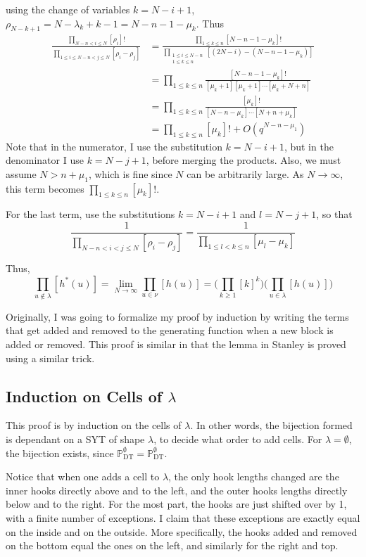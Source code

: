 \documentclass{amsart}
\newcommand{\dt}[1]{\mathbb{P}_\mathrm{DT}^{#1}}
\theoremstyle{definition}
\begin{document}
using the change of variables $k = N - i + 1$, $\rho_{N-k+1} = N -
\lambda_k + k - 1 = N - n - 1 - \mu_k$.  Thus
\begin{align*}
  \frac{\displaystyle
    \prod_{N-n < i \leq N}[\rho_i]!
  }{\displaystyle
    \prod_{1 \leq i \leq N-n < j \leq N}[\rho_i-\rho_j]
  }
  &= \frac{ \displaystyle
    \prod_{1 \leq k \leq n} [N - n - 1 - \mu_k]!
  }{\displaystyle
    \prod_{\substack{1 \leq i \leq N-n \\ 1 \leq k \leq n}} [(2N-i) -
    (N-n-1-\mu_k)]
  } \\
  &= \prod_{1\leq k \leq n} \frac{
    [N-n-1-\mu_k]!
  }{
    [\mu_k+1][\mu_k+1]\cdots [\mu_k + N + n]
    } \\
  &= \prod_{1\leq k \leq n} \frac{[\mu_k]!}{[N-n-\mu_k]\cdots
    [N+n+\mu_k]} \\
  &= \prod_{1\leq k \leq n} [\mu_k]! + O(q^{N-n-\mu_1})
\end{align*}
Note that in the numerator, I use the substitution $k = N - i + 1$,
but in the denominator I use $k = N - j + 1$, before merging the
products.  Also, we must assume $N > n + \mu_1$, which is fine since
$N$ can be arbitrarily large.  As $N \to \infty$, this term becomes
$\prod_{1\leq k\leq n}[\mu_k]!$.

For the last term, use the substitutions $k = N - i + 1$ and $l = N -
j + 1$, so that
\[
  \frac{1}{\displaystyle\prod_{N-n<i<j\leq N}[\rho_i - \rho_j]} =
  \frac{1}{\displaystyle\prod_{1\leq l<k\leq n}
    [\mu_l - \mu_k]}
\]

Thus,
\[
  \prod_{u \notin \lambda} [h^*(u)] =
  \lim_{N\to\infty} \prod_{u \in \nu} [h(u)] =
  \Bigg(\prod_{k\geq 1}[k]^k\Bigg)\Bigg( \prod_{u \in \lambda} [h(u)]\Bigg)
\]

Originally, I was going to formalize my proof by induction by writing
the terms that get added and removed to the generating function when a
new block is added or removed.  This proof is similar in that the
lemma in Stanley is proved using a similar trick.

\subsection{Induction on Cells of $\lambda$}
This proof is by induction on the cells of $\lambda$.  In other words,
the bijection formed is dependant on a SYT of shape $\lambda$, to
decide what order to add cells.  For $\lambda = \emptyset$, the
bijection exists, since $\dt{\emptyset} = \dt{\emptyset}$.

Notice that when one adds a cell to $\lambda$, the only hook lengths
changed are the inner hooks directly above and to the left, and the
outer hooks lengths directly below and to the right.  For the most
part, the hooks are just shifted over by 1, with a finite number of
exceptions.  I claim that these exceptions are exactly equal on the
inside and on the outside.  More specifically, the hooks added and
removed on the bottom equal the ones on the left, and similarly for
the right and top.
\end{document}
